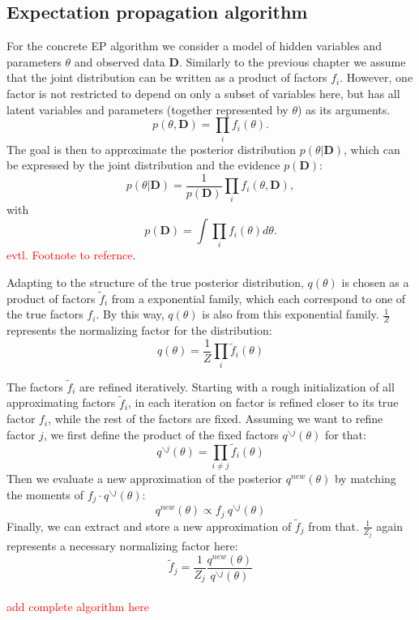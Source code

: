 \documentclass{sigkdd}
\begin{document}
\subsection{Expectation propagation algorithm}
For the concrete EP algorithm we consider a model of hidden variables and parameters $\theta$ and observed data $\mathbf{D}$. Similarly to the previous chapter we assume that the joint distribution can be written as a product of factors $f_i$. However, one factor is not restricted to depend on only a subset of variables here, but has all latent variables and parameters (together represented by $\theta$) as its arguments.
\begin{equation}\label{eq:ep3}
p(\theta, \mathbf{D}) = \prod_i f_i(\theta).
\end{equation}
The goal is then to approximate the posterior distribution $p(\theta|\mathbf{D})$, which can be expressed by the joint distribution and the evidence $p(\mathbf{D})$:
\begin{equation}\label{eq:ep4}
p(\theta|\mathbf{D}) = \frac{1}{p(\mathbf{D})} \prod_i f_i(\theta , \mathbf{D}),
\end{equation}
with 
\begin{equation}\label{eq:ep5}
p(\mathbf{D}) = \int \prod_i f_i(\theta) d\theta.
\end{equation}
\textcolor{red}{evtl. Footnote to refernce}.  

Adapting to the structure of the true posterior distribution, $q(\theta)$ is chosen as a product of factors $\tilde{f}_i$ from a exponential family, which each correspond to one of the true factors $f_i$. By this way, $q(\theta)$ is also from this exponential family. $\frac{1}{Z}$ represents the normalizing factor for the distribution:
\begin{equation}\label{eq:ep6}
q(\theta) = \frac{1}{Z}\prod_i \tilde{f}_i(\theta)
\end{equation}

The factors $\tilde{f}_i$ are refined iteratively. Starting with a rough initialization of all approximating factors $\tilde{f}_i$, in each iteration on factor is refined closer to its true factor $f_i$, while the rest of the factors are fixed. Assuming we want to refine factor $j$, we first define the product of the fixed factors $q^{\backslash j}(\theta)$ for that:
\begin{equation}\label{eq:ep7}
q^{\backslash j}(\theta) = \prod_{i\ne j} \tilde{f}_i(\theta)
\end{equation}
Then we evaluate a new approximation of the posterior $q^{new}(\theta)$ by matching the moments of $f_j \cdot q^{\backslash j}(\theta)$:
\begin{equation}\label{eq:ep7}
q^{new}(\theta) \propto f_j ~ q^{\backslash j}(\theta)
\end{equation}
Finally, we can extract and store a new approximation of $\tilde{f}_j$ from that. $\frac{1}{Z_j}$ again represents a necessary normalizing factor here:
\begin{equation}\label{eq:ep8}
\tilde{f}_j = \frac{1}{Z_j} \frac{q^{new}(\theta)}{q^{\backslash j}(\theta)}
\end{equation}
\\ \textcolor{red}{add complete algorithm here}
\end{document}
